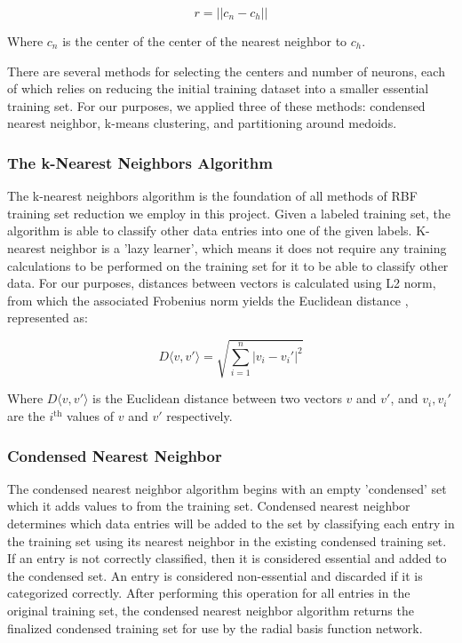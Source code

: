 \begin{equation}
	r = ||c_n - c_h||
\end{equation}

Where $c_n$ is the center of the center of the nearest neighbor to $c_h$.

There are several methods for selecting the centers and number of neurons, each of which relies on reducing the initial training dataset into a smaller essential training set. For our purposes, we applied three of these methods: condensed nearest neighbor, k-means clustering, and partitioning around medoids.

\subsubsection{The k-Nearest Neighbors Algorithm}

The k-nearest neighbors algorithm is the foundation of all methods of RBF training set reduction we employ in this project. Given a labeled training set, the algorithm is able to classify other data entries into one of the given labels. K-nearest neighbor is a 'lazy learner', which means it does not require any training calculations to be performed on the training set for it to be able to classify other data. For our purposes, distances between vectors is calculated using L2 norm, from which the associated Frobenius norm yields the Euclidean distance \citep{GolubGeneH.GeneHoward1989Mc}, represented as:

\begin{equation}
	D\langle v, v' \rangle = \sqrt{\sum_{i=1}^{n}|v_i - v_i'|^2}
\end{equation}

Where $D\langle v, v' \rangle$ is the Euclidean distance between two vectors $v$ and $v'$, and $v_i, v_i'$ are the $i^{\text{th}}$ values of $v$ and $v'$ respectively.

\subsubsection{Condensed Nearest Neighbor}

The condensed nearest neighbor algorithm begins with an empty 'condensed' set which it adds values to from the training set. Condensed nearest neighbor determines which data entries will be added to the set by classifying each entry in the training set using its nearest neighbor in the existing condensed training set. If an entry is not correctly classified, then it is considered essential and added to the condensed set. An entry is considered non-essential and discarded if it is categorized correctly. After performing this operation for all entries in the original training set, the condensed nearest neighbor algorithm returns the finalized condensed training set for use by the radial basis function network.

